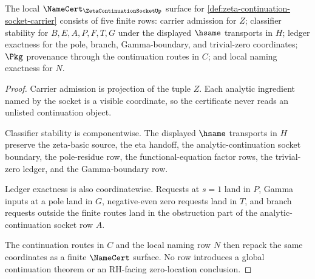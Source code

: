 \begin{theorem}
\label{thm:zeta-continuation-socket-namecert-obligations}
The local $\NameCert_{\ZetaContinuationSocketUp}$ surface for \autoref{def:zeta-continuation-socket-carrier} consists of five finite rows: carrier admission for $Z$; classifier stability for $B,E,A,P,F,T,G$ under the displayed $\hsame$ transports in $H$; ledger exactness for the pole, branch, Gamma-boundary, and trivial-zero coordinates; $\Pkg$ provenance through the continuation routes in $C$; and local naming exactness for $N$.
\end{theorem}
\begin{proof}
Carrier admission is projection of the tuple $Z$. Each analytic ingredient named by the socket is a visible coordinate, so the certificate never reads an unlisted continuation object.

Classifier stability is componentwise. The displayed $\hsame$ transports in $H$ preserve the zeta-basic source, the eta handoff, the analytic-continuation socket boundary, the pole-residue row, the functional-equation factor rows, the trivial-zero ledger, and the Gamma-boundary row.

Ledger exactness is also coordinatewise. Requests at $s=1$ land in $P$, Gamma inputs at a pole land in $G$, negative-even zero requests land in $T$, and branch requests outside the finite routes land in the obstruction part of the analytic-continuation socket row $A$.

The continuation routes in $C$ and the local naming row $N$ then repack the same coordinates as a finite $\NameCert$ surface. No row introduces a global continuation theorem or an RH-facing zero-location conclusion.
\end{proof}

